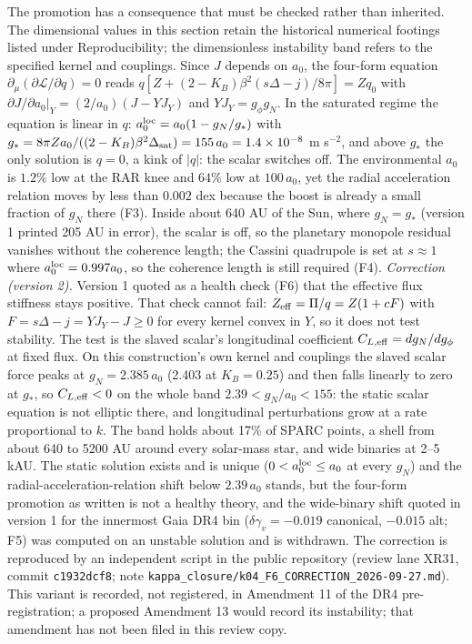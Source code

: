 \documentclass[11pt,letterpaper]{article}
\begin{document}
The promotion has a consequence that must be checked rather than inherited. The dimensional values in this section retain the historical numerical footings listed under Reproducibility; the dimensionless instability band refers to the specified kernel and couplings. Since $J$ depends on $a_0$, the four-form equation $\partial_\mu(\partial\mathcal L/\partial q)=0$ reads $q[Z+(2-K_B)\beta^2(s\Delta-j)/8\pi]=Zq_0$ with $\partial J/\partial a_0|_Y=(2/a_0)(J-YJ_Y)$ and $YJ_Y=g_\phi g_N$. In the saturated regime the equation is linear in $q$: $a_0^{\rm loc}=a_0(1-g_N/g_*)$ with $g_*=8\pi Za_0/((2-K_B)\beta^2\Delta_{\rm sat})=155\,a_0=1.4\times10^{-8}$ m s$^{-2}$, and above $g_*$ the only solution is $q=0$, a kink of $|q|$: the scalar switches off. The environmental $a_0$ is $1.2\%$ low at the RAR knee and $64\%$ low at $100\,a_0$, yet the radial acceleration relation moves by less than $0.002$ dex because the boost is already a small fraction of $g_N$ there (F3). Inside about 640 AU of the Sun, where $g_N=g_*$ (version 1 printed 205 AU in error), the scalar is off, so the planetary monopole residual vanishes without the coherence length; the Cassini quadrupole is set at $s\approx1$ where $a_0^{\rm loc}=0.997a_0$, so the coherence length is still required (F4). \emph{Correction (version 2).} Version 1 quoted as a health check (F6) that the effective flux stiffness stays positive. That check cannot fail: $Z_{\rm eff}=\Pi/q=Z(1+cF)$ with $F=s\Delta-j=YJ_Y-J\ge0$ for every kernel convex in $Y$, so it does not test stability. The test is the slaved scalar's longitudinal coefficient $C_{L,\rm eff}=dg_N/dg_\phi$ at fixed flux. On this construction's own kernel and couplings the slaved scalar force peaks at $g_N=2.385\,a_0$ (2.403 at $K_B=0.25$) and then falls linearly to zero at $g_*$, so $C_{L,\rm eff}<0$ on the whole band $2.39<g_N/a_0<155$: the static scalar equation is not elliptic there, and longitudinal perturbations grow at a rate proportional to $k$. The band holds about 17\% of SPARC points, a shell from about 640 to 5200 AU around every solar-mass star, and wide binaries at 2--5 kAU. The static solution exists and is unique ($0<a_0^{\rm loc}\le a_0$ at every $g_N$) and the radial-acceleration-relation shift below $2.39\,a_0$ stands, but the four-form promotion as written is not a healthy theory, and the wide-binary shift quoted in version 1 for the innermost Gaia DR4 bin ($\delta\gamma_v=-0.019$ canonical, $-0.015$ alt; F5) was computed on an unstable solution and is withdrawn. The correction is reproduced by an independent script in the public repository (review lane XR31, commit \texttt{c1932dcf8}; note \texttt{kappa\_closure/k04\_F6\_CORRECTION\_2026-09-27.md}). This variant is recorded, not registered, in Amendment 11 of the DR4 pre-registration; a proposed Amendment 13 would record its instability; that amendment has not been filed in this review copy.
\end{document}
